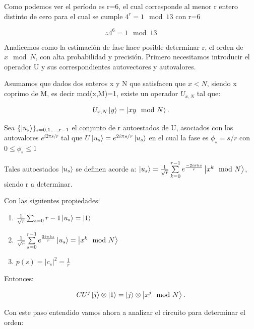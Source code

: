 Como podemos ver el período es r=6, el cual corresponde al menor r entero distinto de cero para el cual se cumple $4^r=1 \mod 13$ con r=6

 $$\therefore 4^6 = 1 \mod 13$$

Analicemos como la estimación de fase hace posible determinar r, el orden de $x \mod N$, con alta probabilidad y precisión. Primero necesitamos introducir el operador U y sus correspondientes autovectores y autovalores.

Asumamos que dados dos enteros x y N que satisfacen que $x<N$, siendo x coprimo de M, es decir mcd(x,M)=1, existe un operador $U_{x,N}$ tal que:

\begin{equation}
    U_{x,N} \ket{y} = \ket{x y \mod N} .
\end{equation}

Sea $\{ \ket{u_s}\}_{s = 0, 1, ..., r-1}$ el conjunto de r autoestados de U, asociados con los autovalores $e^{i 2 \pi s/r}$ tal que $U \ket{u_s} = e^{2 i \pi s /r} \ket{u_s}$ en el cual la fase es $\phi_s = s/r$ con $0 \leq \phi_s \leq 1$

Tales autoestados $\ket{u_s}$ se definen acorde a: $\ket{u_s} = \frac{1}{\sqrt{r}} \sum\limits_{k=0}^{r-1} e^{\frac{-2 i \pi k s}{r}} \ket{x^k \mod N}$, siendo r a determinar.

Con las siguientes propiedades:

\begin{enumerate}
    \item $\frac{1}{\sqrt{r}} \sum_{s=0}{r-1} \ket{u_s} = \ket{1}$
    \item $\frac{1}{\sqrt{r}} \sum\limits_{s=0}^{r-1} e^{\frac{2 i \pi k s}{r}} \ket{u_s} = \ket{x^k \mod N}$
    \item $p(s) = |c_s|^2 = \frac{1}{r}$
\end{enumerate}

Entonces:

\begin{equation}
    CU^j \ket{j} \otimes \ket{1} = \ket{j} \otimes \ket{x^j \mod N} .
\end{equation}

Con este paso entendido vamos ahora a analizar el circuito para determinar el orden:

